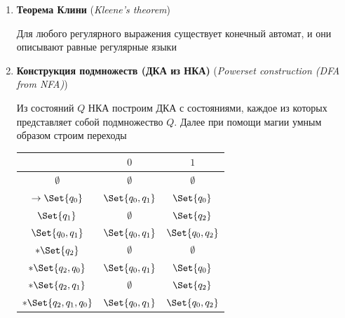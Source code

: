 \documentclass[12pt]{article}
\begin{document}
\begin{enumerate}
        \item \textbf{Теорема Клини} (\textit{Kleene's theorem})

        Для любого регулярного выражения существует конечный автомат, и они описывают равные регулярные языки

        \item \textbf{Конструкция подмножеств (ДКА из НКА)} (\textit{Powerset construction (DFA from NFA)})

        Из состояний $Q$ НКА построим ДКА с состояниями, каждое из которых представляет собой подмножество $Q$.
        Далее при помощи магии умным образом строим переходы

        \begin{multicols}{2}

            \smallvspace

            \begin{tabular}{c|cc}
                & $0$              & $1$              \\
                \hline
                $\emptyset$            & $\emptyset$      & $\emptyset$      \\
                \hline
                $\to\Set{q_0}$         & $\Set{q_0, q_1}$ & $\Set{q_0}$      \\
                \hline
                $\Set{q_1}$            & $\emptyset$      & $\Set{q_2}$      \\
                \hline
                $\Set{q_0, q_1}$       & $\Set{q_0, q_1}$ & $\Set{q_0, q_2}$ \\
                \hline
                $*\Set{q_2}$           & $\emptyset$      & $\emptyset$      \\
                \hline
                $*\Set{q_2, q_0}$      & $\Set{q_0, q_1}$ & $\Set{q_0}$      \\
                \hline
                $*\Set{q_2, q_1}$      & $\emptyset$      & $\Set{q_2}$      \\
                \hline
                $*\Set{q_2, q_1, q_0}$ & $\Set{q_0, q_1}$ & $\Set{q_0, q_2}$ \\
            \end{tabular}


\end{multicols}
\end{enumerate}
\end{document}
